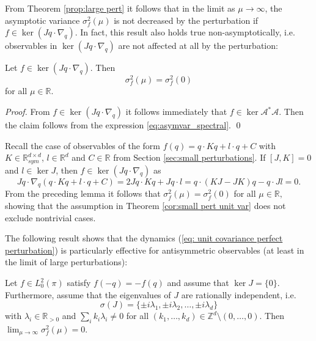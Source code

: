 From Theorem \ref{prop:large pert} it follows that in the limit as $\mu \rightarrow \infty$, the asymptotic variance $\sigma_f^2(\mu)$ is not decreased by the perturbation if $f \in \ker(Jq \cdot \nabla_q)$. In fact, this result also holds true non-asymptotically, i.e. observables in $\ker(Jq \cdot \nabla_q)$ are not affected at all by the perturbation:
\begin{lemma}
	\label{lem:invariant observables}
	Let $f\in \ker (Jq\cdot \nabla_q)$. Then
	\begin{equation*}
	\sigma^2_f(\mu) = \sigma^2_f(0)
	\end{equation*}
	for all $\mu \in \mathbb{R}$.
\end{lemma}
\begin{proof}
	From $f \in  \ker (Jq\cdot \nabla_q)$ it follows immediately that $f \in \ker \mathcal{A}^{*}\mathcal{A}$. Then the claim follows from the expression \eqref{eq:asymvar_spectral}.
	\qed
\end{proof}
\begin{example}
	\label{ex:commutation quadratic observables}
	Recall the case of observables of the form $f(q)=q\cdot Kq+l\cdot q+C$
	with $K\in\mathbb{R}_{sym}^{d\times d}$, $l\in\mathbb{R}^{d}$ and
	$C\in\mathbb{R}$ from Section \ref{sec:small perturbations}. If $[J,K]=0$
	and $l\in\ker J$, then $f\in\ker (Jq\cdot \nabla_q)$ as 
	\[
	Jq\cdot\nabla_{q}(q\cdot Kq+l\cdot q+C)=2Jq\cdot Kq+Jq\cdot l=q\cdot(KJ-JK)q-q\cdot Jl=0.
	\]
	From the preceding lemma it follows that $\sigma_{f}^{2}(\mu)=\sigma_{f}^{2}(0)$
	for all $\mu\in\mathbb{R},$ showing that the assumption in Theorem
	\ref{cor:small pert unit var} does not exclude nontrivial cases.
\end{example}
The following result shows that the dynamics (\ref{eq: unit covariance perfect perturbation})
is particularly effective for antisymmetric observables (at least
in the limit of large perturbations):
\begin{proposition}
	\label{prop:antisymmetric observables}Let $f\in L_{0}^{2}(\pi)$
	satisfy $f(-q)=-f(q)$ and assume that $\ker J=\{0\}$.
	Furthermore, assume that the eigenvalues of $J$ are rationally independent, i.e. 
	\begin{equation}
	\label{eq:rat_indp_spectrum}
	\sigma(J)=\{\pm i\lambda_{1},\pm i\lambda_{2},\ldots,\pm i\lambda_d\}
	\end{equation}
	with $\lambda_{i}\in\mathbb{R}_{>0}$ and  $\sum_i k_i \lambda_i \neq 0$ for all $(k_1,\ldots,k_d)\in\mathbb{Z}^d\setminus(0,\ldots,0)$. Then $\lim_{\mu\rightarrow\infty}\sigma_{f}^{2}(\mu)=0$.
\end{proposition} 
